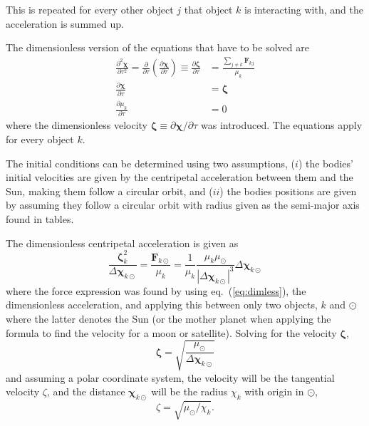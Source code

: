 \documentclass[a4paper,11pt]{article}
\begin{document}
This is repeated for every other object $j$ that object $k$ is interacting with, and the acceleration is summed up.

The dimensionless version of the equations that have to be solved are
\begin{subequations}
    \begin{align}
        \frac{\partial^2 \boldsymbol{\chi}}{\partial \tau^2} = \frac{\partial}{\partial \tau} \left( \frac{\partial \boldsymbol{\chi}}{\partial \tau} \right) \equiv \frac{\partial \boldsymbol{\zeta}}{\partial \tau}  &= \frac{\sum_{j\neq k} \mathbf{F}_{kj}}{\mu_k} \\
        \frac{\partial \boldsymbol{\chi}}{\partial \tau} &= \boldsymbol{\zeta} \\
        \frac{\partial \mu_k}{\partial \tau} &= 0
    \end{align}
    \label{eq:functions}
\end{subequations}
where the dimensionless velocity $\boldsymbol{\zeta} \equiv \partial \boldsymbol{\chi}/\partial \tau$ was introduced. The equations apply for every object $k$.

The initial conditions can be determined using two assumptions, ($i$) the bodies' initial velocities are given by the centripetal acceleration between them and the Sun, making them follow a circular orbit, and ($ii$) the bodies positions are given by assuming they follow a circular orbit with radius given as the semi-major axis found in tables. 

The dimensionless centripetal acceleration is given as 
\begin{equation}
    \frac{\boldsymbol{\zeta}_k^2}{\Delta \boldsymbol{\chi}_{k\odot}} = \frac{\mathbf{F}_{k\odot}}{\mu_k} = \frac{1}{\mu_k} \frac{\mu_k \mu_\odot}{|\Delta \boldsymbol{\chi}_{k\odot}|^3} \Delta \boldsymbol{\chi}_{k\odot}
    \label{eq:centracc}
\end{equation}
where the force expression was found by using eq.~(\ref{eq:dimless}), the dimensionless acceleration, and applying this between only two objects, $k$ and $\odot$ where the latter denotes the Sun (or the mother planet when applying the formula to find the velocity for a moon or satellite). Solving for the velocity $\boldsymbol{\zeta}$,
\[
    \boldsymbol{\zeta} = \sqrt{\frac{\mu_\odot}{\Delta \boldsymbol{\chi}_{k\odot}}}
\]
and assuming a polar coordinate system, the velocity will be the tangential velocity $\zeta$, and the distance $\boldsymbol{\chi}_{k\odot}$ will be the radius $\chi_{k}$ with origin in $\odot$,
\begin{equation}
    \zeta = \sqrt{\mu_\odot/ \chi_{k}}.
    \label{eq:centracc_used}
\end{equation}
\end{document}
